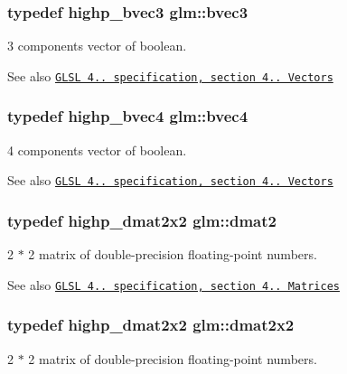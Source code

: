 \subsubsection[{\texorpdfstring{bvec3}{bvec3}}]{\setlength{\rightskip}{0pt plus 5cm}typedef highp\+\_\+bvec3 {\bf glm\+::bvec3}}\hypertarget{group__core__types_ga3f07d6d37fc6fe875170fd5799685bcf}{}\label{group__core__types_ga3f07d6d37fc6fe875170fd5799685bcf}
3 components vector of boolean.

\begin{DoxySeeAlso}{See also}
\href{http://www.opengl.org/registry/doc/GLSLangSpec.4.20.8.pdf}{\tt G\+L\+SL 4.. specification, section 4.. Vectors} 
\end{DoxySeeAlso}
\subsubsection[{\texorpdfstring{bvec4}{bvec4}}]{\setlength{\rightskip}{0pt plus 5cm}typedef highp\+\_\+bvec4 {\bf glm\+::bvec4}}\hypertarget{group__core__types_ga6bb211b3d3bebae3867548d5673ca5cd}{}\label{group__core__types_ga6bb211b3d3bebae3867548d5673ca5cd}
4 components vector of boolean.

\begin{DoxySeeAlso}{See also}
\href{http://www.opengl.org/registry/doc/GLSLangSpec.4.20.8.pdf}{\tt G\+L\+SL 4.. specification, section 4.. Vectors} 
\end{DoxySeeAlso}
\subsubsection[{\texorpdfstring{dmat2}{dmat2}}]{\setlength{\rightskip}{0pt plus 5cm}typedef highp\+\_\+dmat2x2 {\bf glm\+::dmat2}}\hypertarget{group__core__types_gad8c130d26c4cd9a1a831c1a74292a8f6}{}\label{group__core__types_gad8c130d26c4cd9a1a831c1a74292a8f6}
2 $\ast$ 2 matrix of double-\/precision floating-\/point numbers.

\begin{DoxySeeAlso}{See also}
\href{http://www.opengl.org/registry/doc/GLSLangSpec.4.20.8.pdf}{\tt G\+L\+SL 4.. specification, section 4.. Matrices} 
\end{DoxySeeAlso}
\subsubsection[{\texorpdfstring{dmat2x2}{dmat2x2}}]{\setlength{\rightskip}{0pt plus 5cm}typedef highp\+\_\+dmat2x2 {\bf glm\+::dmat2x2}}\hypertarget{group__core__types_gae9932771e11a4f38e21f1136423bab18}{}\label{group__core__types_gae9932771e11a4f38e21f1136423bab18}
2 $\ast$ 2 matrix of double-\/precision floating-\/point numbers.

